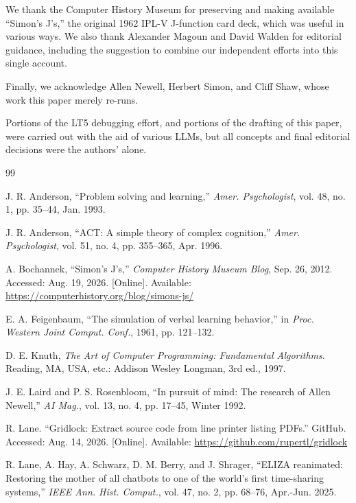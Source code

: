 \documentclass[journal]{IEEEtran}
\begin{document}
We thank the Computer History Museum for preserving and making
available ``Simon's J's,'' the original 1962 IPL-V J-function card
deck, which was useful in various ways.  We also thank Alexander
Magoun and David Walden for editorial guidance, including the
suggestion to combine our independent efforts into this single
account.

Finally, we acknowledge Allen Newell, Herbert Simon, and Cliff Shaw,
whose work this paper merely re-runs.

{\footnotesize Portions of the LT5 debugging effort, and portions of
the drafting of this paper, were carried out with the aid of various
LLMs, but all concepts and final editorial decisions were the
authors' alone.}

\begin{thebibliography}{99}

 J. R. Anderson, ``Problem solving and learning,''
  \textit{Amer. Psychologist}, vol. 48, no. 1, pp. 35--44, Jan. 1993.

 J. R. Anderson, ``ACT: A simple theory of
  complex cognition,'' \textit{Amer. Psychologist}, vol. 51, no. 4,
  pp. 355--365, Apr. 1996.

 A. Bochannek, ``Simon's J's,''
  \textit{Computer History Museum Blog}, Sep. 26, 2012.
  Accessed: Aug. 19, 2026.  [Online].
  Available: \url{https://computerhistory.org/blog/simons-js/}

 E. A. Feigenbaum, ``The simulation of
  verbal learning behavior,'' in \textit{Proc. Western Joint
  Comput. Conf.}, 1961, pp. 121--132.

 D. E. Knuth,
  \textit{The Art of Computer Programming: Fundamental Algorithms}.
  Reading, MA, USA, etc.: Addison Wesley Longman, 3rd ed., 1997.

 J. E. Laird and P. S. Rosenbloom,
  ``In pursuit of mind: The research of Allen Newell,''
  \textit{AI Mag.}, vol. 13, no. 4, pp. 17--45, Winter 1992.

 R. Lane. ``Gridlock: Extract
  source code from line printer listing PDFs.'' GitHub.
  Accessed: Aug. 14, 2026.  [Online].
  Available: \url{https://github.com/rupertl/gridlock}

 R. Lane, A. Hay, A. Schwarz, D. M. Berry, and
  J. Shrager, ``ELIZA reanimated: Restoring the mother of all chatbots
  to one of the world's first time-sharing systems,'' \textit{IEEE
  Ann. Hist. Comput.}, vol. 47, no. 2, pp. 68--76, Apr.-Jun. 2025.


\end{thebibliography}
\end{document}
